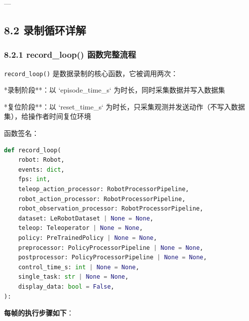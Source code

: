 \documentclass[UTF8,a4paper,11pt]{ctexart}
\begin{document}
{---

\subsection{8.2 录制循环详解}

\subsubsection{8.2.1 record_loop() 函数完整流程}

\texttt{record_loop()} 是数据录制的核心函数，它被调用两次：
\item **录制阶段**：以 `episode_time_s` 为时长，同时采集数据并写入数据集
\item **复位阶段**：以 `reset_time_s` 为时长，只采集观测并发送动作（不写入数据集），给操作者时间复位环境

函数签名：

\begin{lstlisting}[language=python]
def record_loop(
    robot: Robot,
    events: dict,
    fps: int,
    teleop_action_processor: RobotProcessorPipeline,
    robot_action_processor: RobotProcessorPipeline,
    robot_observation_processor: RobotProcessorPipeline,
    dataset: LeRobotDataset | None = None,
    teleop: Teleoperator | None = None,
    policy: PreTrainedPolicy | None = None,
    preprocessor: PolicyProcessorPipeline | None = None,
    postprocessor: PolicyProcessorPipeline | None = None,
    control_time_s: int | None = None,
    single_task: str | None = None,
    display_data: bool = False,
):
\end{lstlisting}

\textbf{每帧的执行步骤如下}：

}
\end{document}
